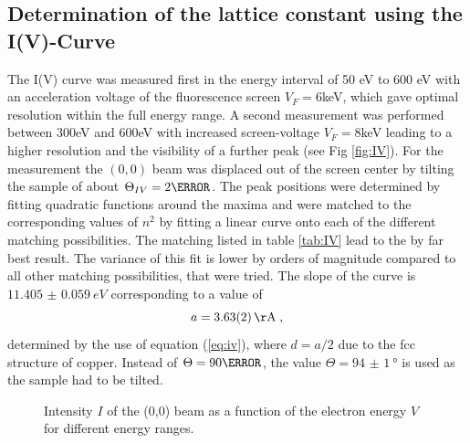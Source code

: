 \documentclass[a4paper]{scrartcl}
\numberwithin{equation}{section}
\numberwithin{figure}{section}
\numberwithin{table}{section}
\newcommand{\eq}[2]{\begin{equation}#1\label{#2}\end{equation}}
\newcommand{\Formel}[1]{(\ref{#1})}
\begin{document}
\subsection{Determination of the lattice constant using the I(V)-Curve}
The I(V) curve was measured first in the energy interval of 50 eV to 600 eV with an acceleration voltage of the fluorescence screen $V_F=6$keV, which gave optimal resolution within the full energy range. A second measurement was performed between 300eV and 600eV with increased screen-voltage $V_F=8$keV leading to a higher resolution and the visibility of a further peak (see Fig \ref{fig:IV}). For the measurement the $(0,0)$ beam was displaced out of the screen center by tilting the sample of about $\Theta_{IV}=2 \degree$. The peak positions were determined by fitting quadratic functions around the maxima and were matched to the corresponding values of $n^2$ by fitting a linear curve onto each of the different matching possibilities. The matching listed in table \ref{tab:IV} lead to the by far best result. The variance of this fit is lower by orders of magnitude compared to all other matching possibilities, that were tried. The slope of the curve is $\SI{11.405(59)}{eV}$ corresponding to a value of 
\eq{a = \SI{3.63(2)}{\AA}  \;,}{ivresult}
determined by the use of equation \Formel{eq:iv}, where $d=a/2$ due to the fcc structure of copper. Instead of $\Theta=90 \degree$, the value $\Theta=\SI{94(1)}{\degree}$ is used as the sample had to be tilted.

\begin{figure} 
 \centering
{}
\hfill
{}
	\caption{\small Intensity $I$ of the (0,0) beam as a function of the electron energy $V$ for different energy ranges.}
	\label{fig:IV1}
\end{figure}
\end{document}
